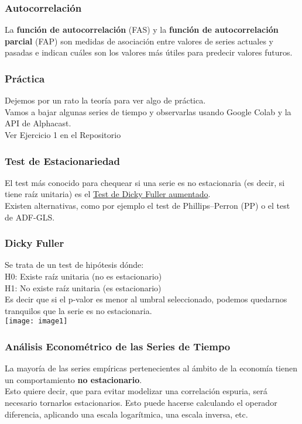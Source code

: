 \documentclass{beamer}
\begin{document}
\begin{frame}
\frametitle{Autocorrelación}
\justify
La \textbf{función de autocorrelación} (FAS) y la \textbf{función de autocorrelación parcial} (FAP) son medidas de asociación entre valores de series actuales y pasadas e indican cuáles son los valores más útiles para predecir valores futuros.
\end{frame}


\begin{frame}
\frametitle{Práctica}
\justify
Dejemos por un rato la teoría para ver algo de práctica. \\
\vspace{5mm} %
Vamos a bajar algunas series de tiempo y observarlas usando Google Colab y la API de Alphacast. \\
\vspace{5mm} %
Ver Ejercicio 1 en el Repositorio
\end{frame}


\begin{frame}
\frametitle{Test de Estacionariedad}
\justify
El test más conocido para chequear si una serie es no estacionaria (es decir, si tiene raíz unitaria) es el \href{https://en.wikipedia.org/wiki/Augmented_Dickey-Fuller_test}{Test de Dicky Fuller aumentado}.\\

\vspace{5mm} %
Existen alternativas, como por ejemplo el test de Phillips–Perron (PP) o el test de ADF-GLS. 
\end{frame}

\begin{frame}
\frametitle{Dicky Fuller}
\justify
Se trata de un test de hipótesis dónde: \\
\centering
H0: Existe raíz unitaria (no es estacionario) \\
H1: No existe raíz unitaria (es estacionario) \\
\justify
Es decir que si el p-valor es menor al umbral seleccionado, podemos quedarnos tranquilos que la serie es no estacionaria. \\
\vspace{3mm} %
\texttt{[image: image1]}
\centering
\end{frame}


\begin{frame}
\frametitle{Análisis Econométrico de las Series de Tiempo}
\justify
La mayoría de las series empíricas pertenecientes al ámbito de la economía tienen un comportamiento \textbf{no estacionario}.\\
\vspace{5mm} %
Esto quiere decir, que para evitar modelizar una correlación espuria, será necesario tornarlos estacionarios. Esto puede hacerse calculando el operador diferencia, aplicando una escala logarítmica, una escala inversa, etc. 
\end{frame}
\end{document}
